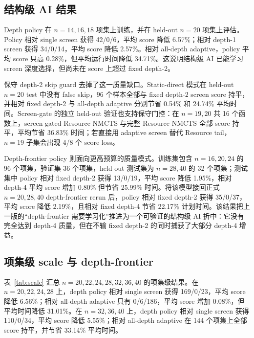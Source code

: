 \documentclass[UTF8,fontset=macnew,11pt]{ctexart}
\newcommand{\method}{Resource-NMCTS}
\begin{document}
\subsection{结构级 AI 结果}

Depth policy 在 $n=14,16,18$ 项集上训练，并在 held-out $n=20$ 项集上评估。Policy 相对 single screen 获得 42/0/6，平均 score 降低 6.57\%；相对 depth-1 screen 获得 34/0/14，平均 score 降低 2.57\%。相对 all-depth adaptive，policy 平均 score 只高 0.28\%，但平均运行时间降低 34.71\%。这说明结构级 AI 已能学习 screen 深度选择，但尚未在 score 上超过 fixed depth-2。

保守 depth-2 skip guard 去掉了这一质量缺口。Static-direct 模式在 held-out $n=20$ test 中没有 false skip，96 个样本全部与 fixed depth-2 screen score 持平，并相对 fixed depth-2 与 all-depth adaptive 分别节省 0.54\% 和 24.74\% 平均时间。Screen-gate 的独立 held-out 验证也支持保守门控：在 $n=19,20$ 共 16 个函数上，screen-gated \method{} 与完整 \method{} 全部 score 持平，平均节省 36.83\% 时间；若直接用 adaptive screen 替代 Resource tail，$n=19$ 子集会出现 4/8 个 score loss。

Depth-frontier policy 则面向更高预算的质量模式。训练集包含 $n=16,20,24$ 的 96 个项集，验证集 36 个项集，held-out 测试集为 $n=28,40$ 的 32 个项集；测试集中 policy 相对 fixed depth-2 获得 13/0/19，平均 score 降低 1.95\%，相对 depth-4 平均 score 增加 0.80\% 但节省 25.99\% 时间。将该模型接回正式 $n=20,28,40$ depth-frontier rerun 后，policy 相对 fixed depth-2 获得 35/0/37，平均 score 降低 2.19\%，且相对 fixed depth-4 节省 22.17\% 计划时间。该结果把上一版的“depth-frontier 需要学习化”推进为一个可验证的结构级 AI 折中：它没有完全达到 depth-4 质量，但在不输 fixed depth-2 的同时捕获了大部分 depth-4 增益。

\subsection{项集级 scale 与 depth-frontier}

表~\ref{tab:scale} 汇总 $n=20,22,24,28,32,36,40$ 的项集级结果。在 $n=20,22,24,28$ 上，depth policy 相对 single screen 获得 169/0/23，平均 score 降低 6.56\%；相对 all-depth adaptive 只有 0/6/186，平均 score 增加 0.08\%，但平均时间降低 31.01\%。在 $n=32,36,40$ 上，depth policy 相对 single screen 获得 110/0/34，平均 score 降低 5.55\%；相对 all-depth adaptive 在 144 个项集上全部 score 持平，并节省 33.14\% 平均时间。
\end{document}
